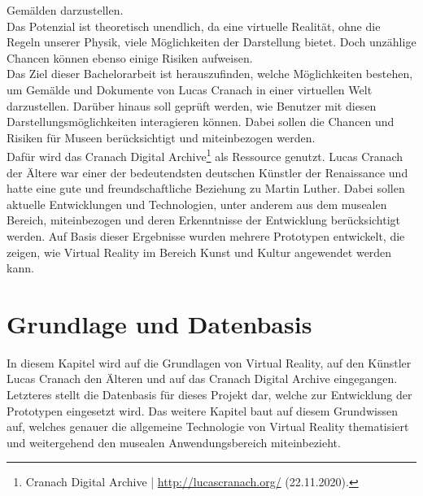 \documentclass[a4paper,12pt,oneside]{article}
\begin{document}
    Gemälden darzustellen. \\
    Das Potenzial ist theoretisch unendlich, da eine virtuelle Realität, ohne die Regeln
    unserer Physik, viele Möglichkeiten der Darstellung bietet.
    Doch unzählige Chancen können ebenso einige Risiken aufweisen. \\
    Das Ziel dieser Bachelorarbeit ist herauszufinden, 
    welche Möglichkeiten bestehen, um
    Gemälde und Dokumente von Lucas Cranach in einer virtuellen Welt darzustellen. 
    Darüber hinaus soll geprüft werden, wie Benutzer mit diesen Darstellungsmöglichkeiten 
    interagieren können. Dabei sollen die Chancen und Risiken für Museen
    berücksichtigt und miteinbezogen werden. \\  
    Dafür wird das Cranach Digital Archive\footnote{Cranach Digital Archive | \url{http://lucascranach.org/} (22.11.2020).}
    als Ressource genutzt. Lucas Cranach der Ältere war einer der bedeutendsten
    deutschen Künstler der Renaissance und hatte eine gute und freundschaftliche
    Beziehung zu Martin Luther. Dabei sollen aktuelle Entwicklungen und Technologien, 
    unter anderem aus dem musealen Bereich, 
    miteinbezogen und deren Erkenntnisse der Entwicklung berücksichtigt werden.
    Auf Basis dieser Ergebnisse wurden mehrere Prototypen entwickelt,
    die zeigen, wie Virtual Reality im Bereich Kunst und Kultur angewendet werden kann. \\
  \section{Grundlage und Datenbasis}
    In diesem Kapitel wird auf die Grundlagen von Virtual Reality, auf den Künstler Lucas Cranach 
    den Älteren und auf das Cranach Digital Archive eingegangen. Letzteres stellt 
    die Datenbasis für dieses Projekt dar, welche zur Entwicklung der Prototypen 
    eingesetzt wird. 
    Das weitere Kapitel baut auf diesem Grundwissen auf, welches genauer 
    die allgemeine Technologie von Virtual Reality thematisiert und weitergehend
    den musealen Anwendungsbereich miteinbezieht.
\end{document}
